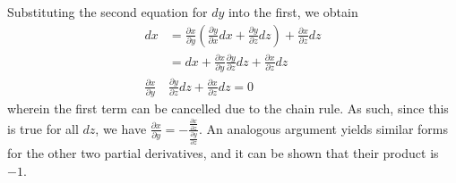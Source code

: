 \documentclass{article}
\begin{document}
Substituting the second equation for $dy$ into the first, we obtain
\begin{equation*}
    \begin{aligned}
        dx &= \frac{\partial x}{\partial y}(\frac{\partial y}{\partial x} dx + \frac{\partial y}{\partial z} dz) + \frac{\partial x}{\partial z} dz \\
        &= dx + \frac{\partial x}{\partial y} \frac{\partial y}{\partial z} dz+\frac{\partial x}{\partial z} dz \\
        \frac{\partial x}{\partial y}& \frac{\partial y}{\partial z} dz+\frac{\partial x}{\partial z} dz = 0
    \end{aligned}
\end{equation*}
wherein the first term can be cancelled due to the chain rule. As such, since this is true for all $dz$, we have $\frac{\partial x}{\partial y} = -\frac{\frac{\partial x}{\partial z}}{\frac{\partial y}{\partial z}}.$ An analogous argument yields similar forms for the other two partial derivatives, and it can be shown that their product is $-1$.

\hrulefill
\end{document}
